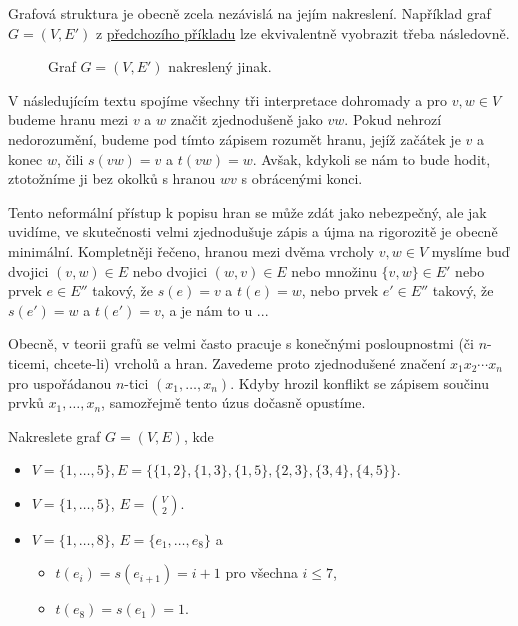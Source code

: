 \begin{warning}
 Grafová struktura je obecně zcela nezávislá na jejím nakreslení. Například graf
 $G = (V,E')$ z \hyperref[exam:interpretace-grafu]{předchozího příkladu} lze
 ekvivalentně vyobrazit třeba následovně.
 \begin{figure}[H]
  \centering
  \caption{Graf $G = (V,E')$ nakreslený jinak.}
  \label{fig:graf-podruhe}
 \end{figure}

\end{warning}

V následujícím textu spojíme všechny tři interpretace dohromady a pro $v,w \in
V$ budeme hranu mezi $v$ a $w$ značit zjednodušeně jako $vw$. Pokud nehrozí
nedorozumění, budeme pod tímto zápisem rozumět hranu, jejíž začátek je $v$ a
konec $w$, čili $s(vw) = v$ a $t(vw) = w$. Avšak, kdykoli se nám to bude hodit,
ztotožníme ji bez okolků s hranou $wv$ s obrácenými konci.

Tento neformální přístup k popisu hran se může zdát jako nebezpečný, ale jak
uvidíme, ve skutečnosti velmi zjednodušuje zápis a újma na rigorozitě je obecně
minimální. Kompletněji řečeno, hranou mezi dvěma vrcholy ${v,w \in V}$ myslíme
buď dvojici $(v,w) \in E$ nebo dvojici $(w,v) \in E$ nebo množinu $\{v,w\} \in
E'$ nebo prvek $e \in E''$ takový, že $s(e) = v$ a $t(e) = w$, nebo prvek $e'
\in E''$ takový, že $s(e') = w$ a $t(e') = v$, a je nám to u ...

Obecně, v teorii grafů se velmi často pracuje s konečnými posloupnostmi (či
$n$-ticemi, chcete-li) vrcholů a hran. Zavedeme proto zjednodušené značení
$x_1x_2\cdots x_n$ pro uspořádanou $n$-tici $(x_1,\ldots,x_n)$. Kdyby hrozil
konflikt se zápisem součinu prvků $x_1,\ldots,x_n$, samozřejmě tento úzus
dočasně opustíme.

\begin{exercise}
 Nakreslete graf $G = (V,E)$, kde
 \begin{itemize}
  \item $V = \{1,\ldots,5\}, E = \{\{1,2\}, \{1,3\}, \{1,5\}, \{2,3\},
   \{3,4\},\{4,5\}\}$.
  \item $V = \{1,\ldots,5\}$, $E = \binom{V}{2}$.
  \item $V = \{1,\ldots,8\}$, $E = \{e_1,\ldots,e_8\}$ a
  \begin{itemize}
   \item $t(e_i) = s(e_{i+1}) = i + 1$ pro všechna $i \leq 7$,
   \item $t(e_8) = s(e_1) = 1$.
  \end{itemize}
 \end{itemize}
\end{exercise}

